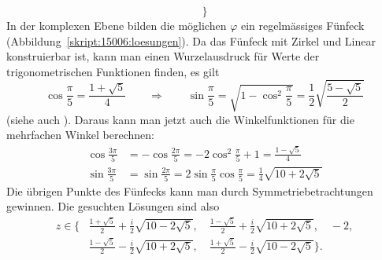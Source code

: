 \begin{loesung}
\[\biggr\}
\]
In der komplexen Ebene bilden die möglichen $\varphi$ ein regelmässiges
Fünfeck (Abbildung~\ref{skript:15006:loesungen}).
Da das Fünfeck mit Zirkel und Linear konstruierbar ist, kann man
einen Wurzelausdruck für Werte der trigonometrischen Funktionen 
finden, es gilt
\[
\cos\frac{\pi}{5}=\frac{1+\sqrt{5}}4
\qquad
\Rightarrow
\qquad
\sin\frac{\pi}5
=
\sqrt{1-\cos^2\frac{\pi}5}
=
\frac12\sqrt{\frac{5-\sqrt{5}}2}
\]
(siehe auch \cite{skript:pentagon}).
Daraus kann man jetzt auch die Winkelfunktionen für die mehrfachen
Winkel berechnen:
\begin{align*}
\cos\frac{3\pi}5
&=
-\cos\frac{2\pi}5
=
-2\cos^2\frac{\pi}5+1
=
\frac{1-\sqrt{5}}4
\\
\sin\frac{3\pi}5
&=
\sin\frac{2\pi}5
=
2\sin\frac{\pi}5\cos\frac{\pi}5
=
\frac14\sqrt{10+2\sqrt{5}}
\end{align*}
Die übrigen Punkte des Fünfecks kann man durch Symmetriebetrachtungen
gewinnen.
Die gesuchten Lösungen sind also
\begin{align*}
z
\in
\biggl\{
&
\frac{1+\sqrt{5}}2+\frac{i}2\sqrt{10-2\sqrt{5}},\quad
\frac{1-\sqrt{5}}2 + \frac{i}2\sqrt{10+2\sqrt{5}},\quad
-2,
\\
&
\frac{1-\sqrt{5}}2 - \frac{i}2\sqrt{10+2\sqrt{5}},\quad
\frac{1+\sqrt{5}}2-\frac{i}2\sqrt{10-2\sqrt{5}}
\biggr\}.
\end{align*}
\end{loesung}

